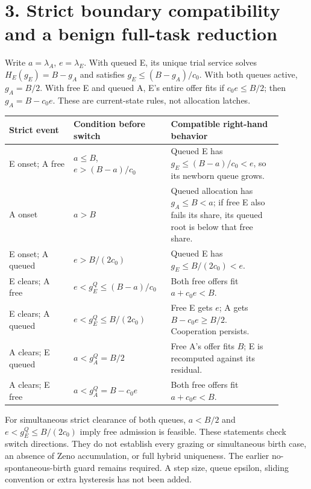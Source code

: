 \documentclass[11pt,a4paper]{article}
\begin{document}
\newpage
\section*{3. Strict boundary compatibility and a benign full-task reduction}

Write $a=\lambda_A$, $e=\lambda_E$. With queued E, its unique trial
service solves $H_E(g_E)=B-g_A$ and satisfies
$g_E\leq(B-g_A)/c_0$. With both queues active, $g_A=B/2$.
With free E and queued A, E's entire offer fits if $c_0e\leq B/2$;
then $g_A=B-c_0e$. These are current-state rules, not allocation latches.

\begin{center}
\small
\begin{tabular}{p{0.22\linewidth}p{0.30\linewidth}p{0.38\linewidth}}
\toprule
Strict event & Condition before switch & Compatible right-hand behavior\\
\midrule
E onset; A free & $a\leq B$, $e>(B-a)/c_0$ &
Queued E has $g_E\leq(B-a)/c_0<e$, so its newborn queue grows.\\[4pt]
A onset & $a>B$ & Queued allocation has $g_A\leq B<a$;
if free E also fails its share, its queued root is below that free share.\\[4pt]
E onset; A queued & $e>B/(2c_0)$ &
Queued E has $g_E\leq B/(2c_0)<e$.\\[4pt]
E clears; A free & $e<g_E^Q\leq(B-a)/c_0$ &
Both free offers fit $a+c_0e<B$.\\[4pt]
E clears; A queued & $e<g_E^Q\leq B/(2c_0)$ &
Free E gets $e$; A gets $B-c_0e\geq B/2$. Cooperation persists.\\[4pt]
A clears; E queued & $a<g_A^Q=B/2$ &
Free A's offer fits $B$; E is recomputed against its residual.\\[4pt]
A clears; E free & $a<g_A^Q=B-c_0e$ &
Both free offers fit $a+c_0e<B$.\\
\bottomrule
\end{tabular}
\end{center}
For simultaneous strict clearance of both queues, $a<B/2$ and
$e<g_E^Q\leq B/(2c_0)$ imply free admission is feasible. These statements
check switch directions. They do not establish every grazing or simultaneous
birth case, an absence of Zeno accumulation, or full hybrid uniqueness.
The earlier no-spontaneous-birth guard remains required. A step size,
queue epsilon, sliding convention or extra hysteresis has not been added.
\end{document}
